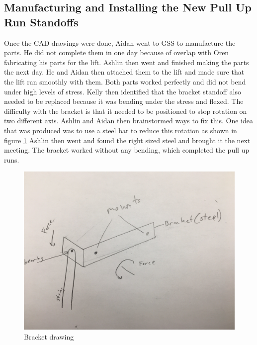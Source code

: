 \documentclass{article}
\begin{document}
\subsection{Manufacturing and Installing the New Pull Up Run Standoffs}
Once the CAD drawings were done, Aidan went to GSS to manufacture the parts. He did not complete them in one day because of overlap with Oren fabricating his parts for the lift. Ashlin then went and finished making the parts the next day. He and Aidan then attached them to the lift and made sure that the lift ran smoothly with them. Both parts worked perfectly and did not bend under high levels of stress. Kelly then identified that the bracket standoff also needed to be replaced because it was bending under the stress and flexed. The difficulty with the bracket is that it needed to be positioned to stop rotation on two different axis. Ashlin and Aidan then brainstormed ways to fix this. One idea that was produced was to use a steel bar to reduce this rotation as shown in figure \ref{fig: bracket} Ashlin then went and found the right sized steel and brought it the next meeting. The bracket worked without any bending, which completed the pull up runs.

\begin{figure}
    \centering
    \includegraphics[width= 0.5 \textwidth]{26_02-25/images/Bracket.jpg}
    \caption{Bracket drawing}
    \label{fig: bracket}
\end{figure}
\end{document}
